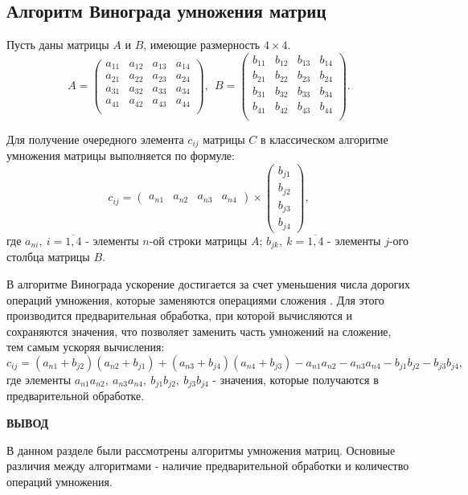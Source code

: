 \subsection{Алгоритм Винограда умножения матриц}

Пусть даны матрицы $A$ и  $B$, имеющие размерность  $4\times 4$.
\begin{equation}
    A = 
\begin{pmatrix}
    a_{11} & a_{12} & a_{13} & a_{14} \\
    a_{21} & a_{22} & a_{23} & a_{24} \\
    a_{31} & a_{32} & a_{33} & a_{34} \\
    a_{41} & a_{42} & a_{43} & a_{44} \\
\end{pmatrix}, \ \
    B = 
\begin{pmatrix}
    b_{11} & b_{12} & b_{13} & b_{14} \\
    b_{21} & b_{22} & b_{23} & b_{24} \\
    b_{31} & b_{32} & b_{33} & b_{34} \\
    b_{41} & b_{42} & b_{43} & b_{44} \\
\end{pmatrix}.
\end{equation}

Для получение очередного элемента $c_{ij}$ матрицы $C$ в классическом
алгоритме умножения матрицы выполняется по формуле:
\begin{equation}
    c_{ij} = \begin{pmatrix} a_{n1} & a_{n2} & a_{n3} & a_{n4} \end{pmatrix} 
    \times 
    \begin{pmatrix} b_{j1}\\ b_{j2}\\ b_{j3}\\ b_{j4} \end{pmatrix},
\end{equation}
где $a_{ni}, \ i = \overline{1,4}$ - элементы $n$-ой строки матрицы  $A$;
$b_{jk}, \ k = \overline{1,4}$ - элементы $j$-ого столбца матрицы  $B$.

В алгоритме Винограда ускорение достигается за счет уменьшения числа дорогих операций умножения, которые заменяются операциями сложения \cite{Vinograd}. Для этого производится предварительная обработка, при которой вычисляются и сохраняются значения, что позволяет заменить часть умножений на сложение, тем самым ускоряя вычисления:
\begin{equation}
    c_{ij} = (a_{n1} + b_{j2}) (a_{n2} + b_{j1})
    + (a_{n3} + b_{j4})(a_{n4} + b_{j 3})
    - a_{n 1}a_{n 2} - a_{n 3}a_{n 4} - b_{j 1}b_{j 2} - b_{j 3}b_{j 4},
\end{equation}
где элементы $a_{n 1}a_{n 2}, \ a_{n 3}a_{n 4}, \ b_{j 1}b_{j 2}, \ b_{j 3}b_{j 4}$ - значения,
которые получаются в предварительной обработке.

\vspace{5mm}

\textbf{ВЫВОД}

В данном разделе были рассмотрены алгоритмы умножения матриц. Основные различия между
алгоритмами - наличие предварительной обработки и количество операций умножения.